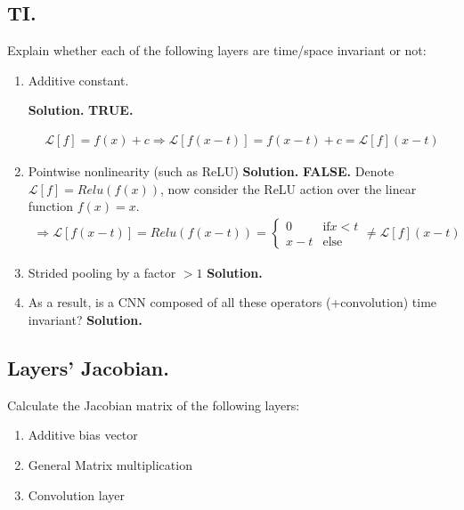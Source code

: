 \documentclass{article}
\begin{document}
\subsection{TI.} Explain whether each of the following layers are time/space invariant or not:
\begin{enumerate}
  \item Additive constant.

    \textbf{Solution.} \textbf{TRUE.} 

\begin{equation*}
    \begin{split}
    \mathcal{L}[f] = f(x) + c \Rightarrow  \mathcal{L}[f(x-t)] = f(x-t) + c =  \mathcal{L}[f](x-t)
    \end{split}
\end{equation*}

  \item Pointwise nonlinearity (such as ReLU)
    \textbf{Solution.} \textbf{FALSE.} Denote $\mathcal{L}[f] = Relu(f(x))$, now consider the ReLU action over the linear function $f(x) = x$.   
\begin{equation*}
    \begin{split}
      \Rightarrow  \mathcal{L}[f(x-t)] = Relu(f(x-t))  =  \begin{cases}  
        0 & \text{if} x < t \\ 
        x - t & \text{else}
      \end{cases}   \neq \mathcal{L}[f](x-t)
    \end{split}
\end{equation*}
  \item Strided pooling by a factor $ > 1 $
\textbf{Solution.}
  \item As a result, is a CNN composed of all these operators (+convolution) time invariant?
\textbf{Solution.}
\end{enumerate}

\subsection{Layers’ Jacobian.} Calculate the Jacobian matrix of the following layers:
\begin{enumerate}
  \item Additive bias vector
  \item General Matrix multiplication
  \item Convolution layer
\end{enumerate}
\end{document}
